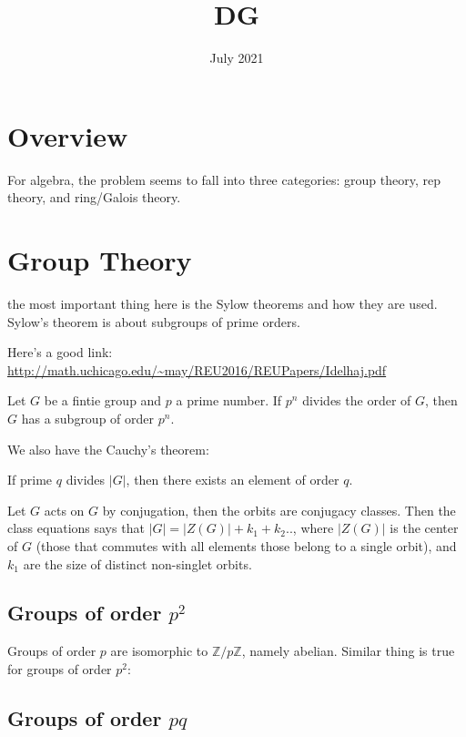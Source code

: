\documentclass[main.tex]{subfiles}
\title{DG}
\date{July 2021}
\begin{document}
\maketitle


\section{Overview}
For algebra, the problem seems to fall into three categories: group theory, rep theory, and ring/Galois theory.

\section{Group Theory}
the most important thing here is the Sylow theorems and how they are used. Sylow's theorem is about subgroups of prime orders.

Here's a good link: \url{http://math.uchicago.edu/~may/REU2016/REUPapers/Idelhaj.pdf}

\begin{theorem}
Let $G$ be a fintie group and $p$ a prime number. If $p^n$ divides the order of $G$, then $G$ has a subgroup of order $p^n$.
\end{theorem}

We also have the Cauchy's theorem:

\begin{theorem}
If prime $q$ divides $|G|$, then there exists an element of order $q$.
\end{theorem}

Let $G$ acts on $G$ by conjugation, then the orbits are conjugacy classes. 
Then the class equations says that $|G| = |Z(G)| + k_1 + k_2 ..$, where $|Z(G)|$ is the center of $G$ (those that commutes with all elements those belong to a single orbit), and $k_1$ are the size of distinct non-singlet orbits.


\subsection{Groups of order $p^2$}
Groups of order $p$ are isomorphic to $\mathbb{Z}/p\mathbb{Z}$, namely abelian. Similar thing is true for groups of order $p^2$:

\begin{theorem}

\end{theorem}

\subsection{Groups of order $pq$}
\end{document}
